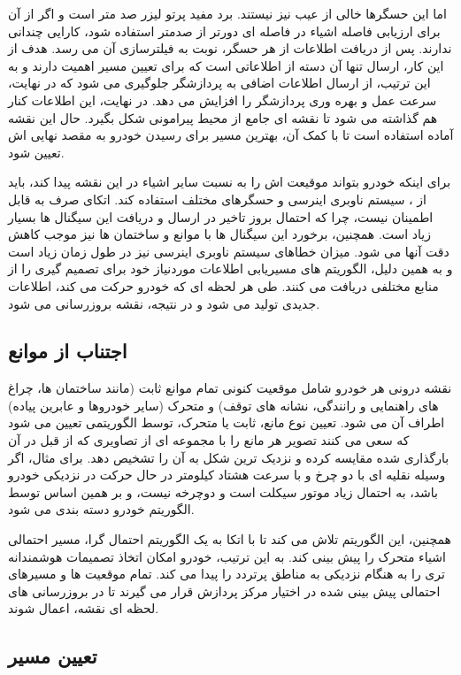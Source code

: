 اما این حسگرها خالی از عیب نیز نیستند. برد مفید پرتو لیزر صد متر است و اگر از آن برای ارزیابی فاصله اشیاء در فاصله ای دورتر از صدمتر استفاده شود، کارایی چندانی ندارند. پس از دریافت اطلاعات از هر حسگر، نوبت به فیلترسازی آن می رسد. هدف از این کار، ارسال تنها آن دسته از اطلاعاتی است که برای تعیین مسیر اهمیت دارند و به این ترتیب، از ارسال اطلاعات اضافی به پردازشگر جلوگیری می شود که در نهایت، سرعت عمل و بهره وری پردازشگر را افزایش می دهد. در نهایت، این اطلاعات کنار هم گذاشته می شود تا نقشه ای جامع از محیط پیرامونی شکل بگیرد. حال این نقشه آماده استفاده است تا با کمک آن، بهترین مسیر برای رسیدن خودرو به مقصد نهایی اش تعیین شود.

برای اینکه خودرو بتواند موقیعت اش را به نسبت سایر اشیاء در این نقشه پیدا کند، باید از ، سیستم ناوبری اینرسی و حسگرهای مختلف استفاده کند. اتکای صرف به  قابل اطمینان نیست، چرا که احتمال بروز تاخیر در ارسال و دریافت این سیگنال ها بسیار زیاد است. همچنین، برخورد این سیگنال ها با موانع و ساختمان ها نیز موجب کاهش دقت آنها می شود. میزان خطاهای سیستم ناوبری اینرسی نیز در طول زمان زیاد است و به همین دلیل، الگوریتم های مسیریابی اطلاعات موردنیاز خود برای تصمیم گیری را از منابع مختلفی دریافت می کنند. طی هر لحظه ای که خودرو حرکت می کند، اطلاعات جدیدی تولید می شود و در نتیجه، نقشه بروزرسانی می شود.

\subsection{اجتناب از موانع}

نقشه درونی هر خودرو شامل موقعیت کنونی تمام موانع ثابت (مانند ساختمان ها، چراغ های راهنمایی و رانندگی، نشانه های توقف) و متحرک (سایر خودروها و عابرین پیاده) اطراف آن می شود. تعیین نوع مانع، ثابت یا متحرک، توسط الگوریتمی تعیین می شود که سعی می کنند تصویر هر مانع را با مجموعه ای از تصاویری که از قبل در آن بارگذاری شده مقایسه کرده و نزدیک ترین شکل به آن را تشخیص دهد. برای مثال، اگر وسیله نقلیه ای با دو چرخ و با سرعت هشتاد کیلومتر در حال حرکت در نزدیکی خودرو باشد، به احتمال زیاد موتور سیکلت است و دوچرخه نیست، و بر همین اساس توسط الگوریتم خودرو دسته بندی می شود.

همچنین، این الگوریتم تلاش می کند تا با اتکا به یک الگوریتم احتمال گرا، مسیر احتمالی اشیاء متحرک را پیش بینی کند. به این ترتیب، خودرو امکان اتخاذ تصمیمات هوشمندانه تری را به هنگام نزدیکی به مناطق پرتردد را پیدا می کند. تمام موقعیت ها و مسیرهای احتمالی پیش بینی شده در اختیار مرکز پردازش قرار می گیرند تا در بروزرسانی های لحظه ای نقشه، اعمال شوند.

\subsection{تعیین مسیر}

